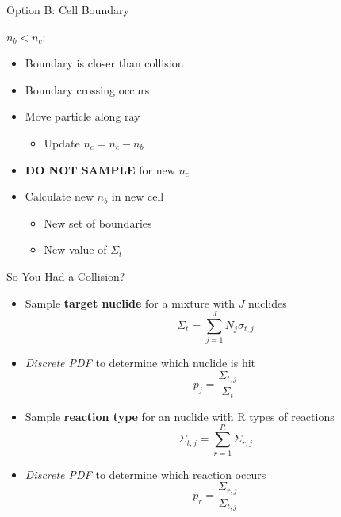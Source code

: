 \documentclass[xcolor=x11names,compress,handout]{beamer}
\renewcommand{\(}{\begin{columns}}
\renewcommand{\)}{\end{columns}}
\newcommand{\<}[1]{\begin{column}{#1}}
\renewcommand{\>}{\end{column}}
\begin{document}
\begin{frame}{Option B: Cell Boundary}

  \underline{$n_b < n_c$}:
  \begin{itemize}
    \item Boundary is closer than collision
    \item \alert{Boundary crossing occurs}
  \end{itemize}
    \vspace*{0.5 em}
  \pause

  \begin{itemize}
  \item Move particle along ray
  \begin{itemize}
    \item Update $n_c = n_c - n_b$
  \end{itemize}
  \item \textbf{DO NOT SAMPLE} for new $n_c$
  \vspace*{1 em}
  \pause
  \item Calculate new $n_b$ in new cell
  \begin{itemize}
    \item New set of boundaries
    \item New value of $\Sigma_t$
  \end{itemize}
\end{itemize}

\end{frame}


\begin{frame}{So You Had a Collision?}

\begin{itemize}
  \item Sample \textbf{target nuclide} for a mixture with $J$ nuclides
    \[\Sigma_t = \sum_{j=1}^J N_j \sigma_{t,j}\]
  \item \textit{Discrete PDF} to determine which nuclide is hit
    \[p_j = \frac{\Sigma_{t,j}}{\Sigma_t}\]
  \pause
  \item Sample \textbf{reaction type} for an nuclide with R types of reactions
     \[\Sigma_{t,j} = \sum_{r=1}^R \Sigma_{r,j}\]
  \item \textit{Discrete PDF} to determine which reaction occurs
    \[p_r = \frac{\Sigma_{r,j}}{\Sigma_{t,j}}\]
\end{itemize}

\end{frame}
\end{document}
